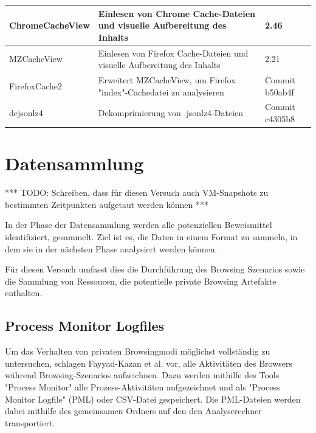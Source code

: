\begin{table}[]
{\begin{tabular}{|l|l|l|}
ChromeCacheView                         & Einlesen von Chrome Cache-Dateien und visuelle Aufbereitung des Inhalts          & 2.46                                  \\ \hline
MZCacheView                             & Einlesen von Firefox Cache-Dateien und visuelle Aufbereitung des Inhalts         & 2.21                                  \\ \hline
FirefoxCache2                           & Erweitert MZCacheView, um Firefox "index"-Cachedatei zu analysieren              & Commit b50ab4f                        \\ \hline
dejsonlz4                               & Dekomprimierung von .jsonlz4-Dateien                                             & Commit c4305b8                        \\ \hline
\end{tabular}
}
\end{table}



\section{Datensammlung}

*** TODO: Schreiben, dass für diesen Versuch auch VM-Snapshots zu bestimmten Zeitpunkten aufgetaut werden können ***

In der Phase der Datensammlung werden alle potenziellen Beweismittel identifiziert, gesammelt. Ziel ist es, die Daten in einem Format zu sammeln, in dem sie in der nächsten Phase analysiert werden können. \cite{Izzati.2022}

Für diesen Versuch umfasst dies die Durchführung des Browsing Szenarios sowie die Sammlung von Ressoucen, die potentielle private Browsing Artefakte enthalten.

\subsection*{Process Monitor Logfiles}

Um das Verhalten von privaten Browsingmodi möglichst vollständig zu untersuchen, schlagen Fayyad-Kazan et al. \cite{Fayyad.2021} vor, alle Aktivitäten des Browsers während Browsing-Szenarios aufzeichnen.
Dazu werden mithilfe des Tools "Process Monitor" alle Prozess-Aktivitäten aufgezeichnet 
und als "Process Monitor Logfile" (PML) oder CSV-Datei gespeichert. \cite{Fayyad.2021, Rochmadi.2017}
Die PML-Dateien werden dabei mithilfe des gemeinsamen Ordners auf den den Analyserechner transportiert.

